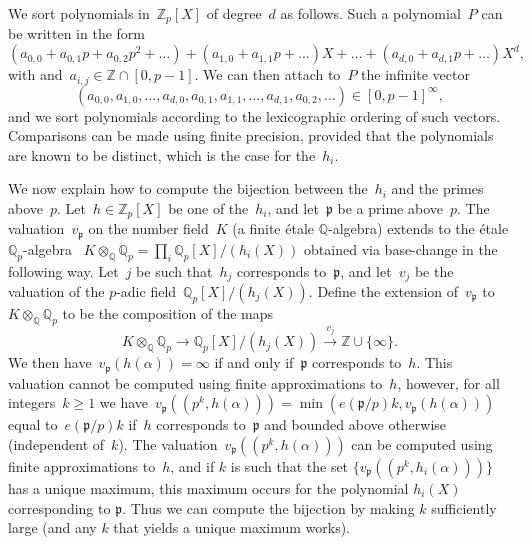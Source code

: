 \documentclass{article}
\def\Z{{\mathbb Z}}
\def\Q{{\mathbb Q}}
\def\p{{\mathfrak p}}
\DeclareMathOperator{\disc}{disc}
\begin{document}
We sort polynomials in~$\Z_p[X]$ of degree~$d$ as follows. Such a polynomial~$P$
can be written in the form
\[
  (a_{0,0}+a_{0,1}p+a_{0,2}p^2+\dots) + (a_{1,0}+a_{1,1}p+\dots)X
  + \dots + (a_{d,0}+a_{d,1}p+\dots)X^d,
\]
with and~$a_{i,j}\in\Z\cap[0,p-1]$. We can then attach to~$P$ the infinite
vector
\[
(a_{0,0},a_{1,0},\dots,a_{d,0},a_{0,1},a_{1,1},\dots,a_{d,1},a_{0,2},\dots)\in [0,p-1]^\infty,
\]
and we sort polynomials according to the lexicographic ordering of such vectors.
Comparisons can be made using finite precision, provided that the polynomials are known to be
distinct, which is the case for the~$h_i$.


We now explain how to compute the bijection between the~$h_i$ and the primes
above~$p$. Let~$h\in\Z_p[X]$ be one of the~$h_i$, and let~$\p$ be a prime
above~$p$. The valuation~$v_{\p}$ on the number field~$K$ (a finite \'etale $\Q$-algebra) extends to the \'etale $\Q_p$-algebra ~$K\otimes_{\Q}\Q_p = \prod_i
\Q_p[X]/(h_i(X))$ obtained via base-change in the following way.
Let~$j$ be such that~$h_{j}$ corresponds
to~$\p$, and let~$v_j$ be the valuation of the $p$-adic field~$\Q_p[X]/(h_j(X))$.
Define the extension of~$v_\p$ to $K\otimes_\Q\Q_p$ to be the composition of the maps
\[
  K\otimes_{\Q}\Q_p \longrightarrow \Q_p[X]/(h_j(X)) \stackrel{v_j}{\longrightarrow} \Z\cup\{\infty\}.
\]
We then have~$v_{\p}(h(\alpha)) = \infty$ if and only
if~$\p$ corresponds to~$h$.
This valuation cannot be computed using finite
approximations to~$h$, however, for all integers~$k\ge 1$ we have~$v_\p((p^k,h(\alpha)))
= \min(e(\p/p)k, v_\p(h(\alpha)))$ equal to~$e(\p/p)k$
if~$h$ corresponds to~$\p$ and bounded above otherwise (independent of~$k$). The
valuation~$v_\p((p^k,h(\alpha)))$ can be computed using finite approximations
to~$h$, and if $k$ is such that the set $\{v_\p((p^k,h_i(\alpha)))\}$ has a unique maximum, this maximum occurs for the polynomial $h_i(X)$ corresponding to $\p$.
Thus we can compute the bijection by making $k$ sufficiently large (and any $k$ that yields a unique maximum works).
\end{document}
